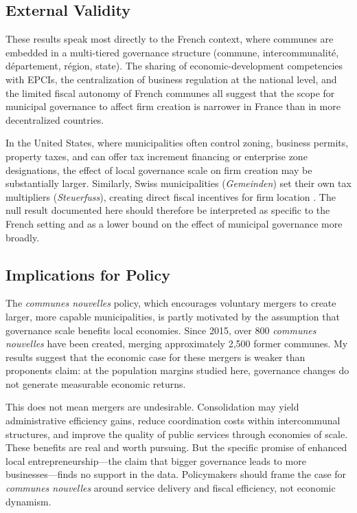 \documentclass[12pt]{article}
\begin{document}
\subsection{External Validity}

These results speak most directly to the French context, where communes are embedded in a multi-tiered governance structure (commune, intercommunalit\'{e}, d\'{e}partement, r\'{e}gion, state). The sharing of economic-development competencies with EPCIs, the centralization of business regulation at the national level, and the limited fiscal autonomy of French communes all suggest that the scope for municipal governance to affect firm creation is narrower in France than in more decentralized countries.

In the United States, where municipalities often control zoning, business permits, property taxes, and can offer tax increment financing or enterprise zone designations, the effect of local governance scale on firm creation may be substantially larger. Similarly, Swiss municipalities (\textit{Gemeinden}) set their own tax multipliers (\textit{Steuerfuss}), creating direct fiscal incentives for firm location \citep{oates1972}. The null result documented here should therefore be interpreted as specific to the French setting and as a lower bound on the effect of municipal governance more broadly.

\subsection{Implications for Policy}

The \textit{communes nouvelles} policy, which encourages voluntary mergers to create larger, more capable municipalities, is partly motivated by the assumption that governance scale benefits local economies. Since 2015, over 800 \textit{communes nouvelles} have been created, merging approximately 2,500 former communes. My results suggest that the economic case for these mergers is weaker than proponents claim: at the population margins studied here, governance changes do not generate measurable economic returns.

This does not mean mergers are undesirable. Consolidation may yield administrative efficiency gains, reduce coordination costs within intercommunal structures, and improve the quality of public services through economies of scale. These benefits are real and worth pursuing. But the specific promise of enhanced local entrepreneurship---the claim that bigger governance leads to more businesses---finds no support in the data. Policymakers should frame the case for \textit{communes nouvelles} around service delivery and fiscal efficiency, not economic dynamism.
\end{document}
